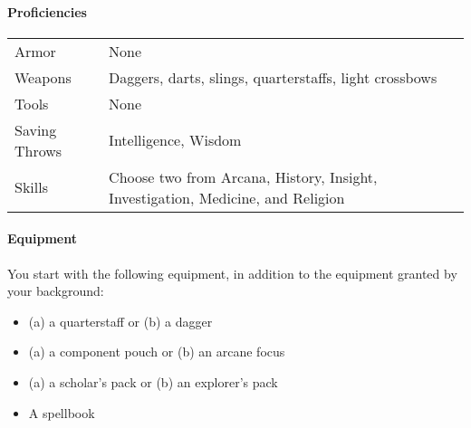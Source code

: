 \paragraph{Proficiencies}\label{_proficiencies_3}

\begin{longtable}[]{@{}
  >{\raggedright\arraybackslash}p{}
  >{\raggedright\arraybackslash}p{}@{}}
\toprule\noalign{}
\endhead
\bottomrule\noalign{}
\endlastfoot
Armor & None \\
Weapons & Daggers, darts, slings, quarterstaffs, light crossbows \\
Tools & None \\
Saving Throws & Intelligence, Wisdom \\
Skills & Choose two from Arcana, History, Insight, Investigation,
Medicine, and Religion \\
\end{longtable}

\paragraph{Equipment}\label{_equipment_3}

You start with the following equipment, in addition to the equipment
granted by your background:

\begin{itemize}
\item
  (a) a quarterstaff or (b) a dagger
\item
  (a) a component pouch or (b) an arcane focus
\item
  (a) a scholar's pack or (b) an explorer's pack
\item
  A spellbook
\end{itemize}

